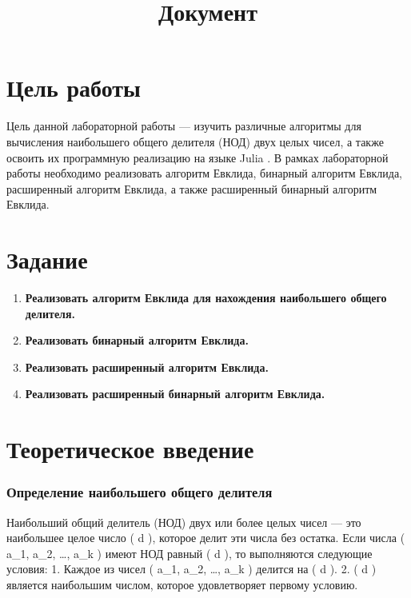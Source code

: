 \documentclass[
]{article}
\title{Документ}
\author{}
\date{}
\providecommand{\tightlist}{%
  \setlength{\itemsep}{0pt}\setlength{\parskip}{0pt}}
\begin{document}
\maketitle

\section{Цель
работы}\label{ux446ux435ux43bux44c-ux440ux430ux431ux43eux442ux44b}

Цель данной лабораторной работы --- изучить различные алгоритмы для
вычисления наибольшего общего делителя (НОД) двух целых чисел, а также
освоить их программную реализацию на языке Julia . В рамках лабораторной
работы необходимо реализовать алгоритм Евклида, бинарный алгоритм
Евклида, расширенный алгоритм Евклида, а также расширенный бинарный
алгоритм Евклида.

\section{Задание}\label{ux437ux430ux434ux430ux43dux438ux435}

\begin{enumerate}
\def\labelenumi{\arabic{enumi}.}
\tightlist
\item
  \textbf{Реализовать алгоритм Евклида для нахождения наибольшего общего
  делителя.}
\item
  \textbf{Реализовать бинарный алгоритм Евклида.}
\item
  \textbf{Реализовать расширенный алгоритм Евклида.}
\item
  \textbf{Реализовать расширенный бинарный алгоритм Евклида.}
\end{enumerate}

\section{Теоретическое
введение}\label{ux442ux435ux43eux440ux435ux442ux438ux447ux435ux441ux43aux43eux435-ux432ux432ux435ux434ux435ux43dux438ux435}

\subsubsection{Определение наибольшего общего
делителя}\label{ux43eux43fux440ux435ux434ux435ux43bux435ux43dux438ux435-ux43dux430ux438ux431ux43eux43bux44cux448ux435ux433ux43e-ux43eux431ux449ux435ux433ux43e-ux434ux435ux43bux438ux442ux435ux43bux44f}

Наибольший общий делитель (НОД) двух или более целых чисел --- это
наибольшее целое число ( d ), которое делит эти числа без остатка. Если
числа ( a\_1, a\_2, \ldots, a\_k ) имеют НОД равный ( d ), то
выполняются следующие условия: 1. Каждое из чисел ( a\_1, a\_2, \ldots,
a\_k ) делится на ( d ). 2. ( d ) является наибольшим числом, которое
удовлетворяет первому условию.
\end{document}
